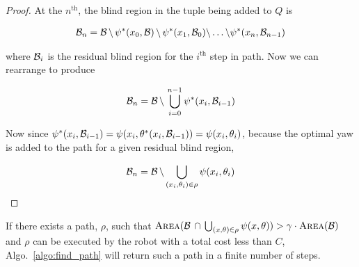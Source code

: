 \begin{proof}

    At the $n^{\text{th}}$, the blind region in the tuple being added to $Q$ is

    \begin{align*}
        {{\mathcal{B}}}_n = {{\mathcal{B}}} \, \backslash \, \psi^*(x_0, {{\mathcal{B}}}) \, \backslash \,
        \psi^*(x_1, {{\mathcal{B}}}_0)
        \backslash \ldots \backslash \psi^*(x_n, {{\mathcal{B}}}_{n - 1})
    \end{align*}

    where ${{\mathcal{B}}}_i$ is the residual blind region for the $i^{\text{th}}$ step in
    path. Now we can rearrange to produce

    \begin{align*}
        {{\mathcal{B}}}_n = {{\mathcal{B}}} \, \backslash \, \bigcup_{i = 0}^{n - 1} 
        \psi^*(x_i, {{\mathcal{B}}}_{i - 1}) \\
    \end{align*}

    Now since $\psi^*(x_i, {{\mathcal{B}}}_{i - 1}) =
    \psi(x_i, \theta^*(x_i, {{\mathcal{B}}}_{i - 1})) = \psi(x_i, \theta_i)$, because
    the optimal yaw is added to the path for a given residual blind region,

    \begin{align*}
        {{\mathcal{B}}}_n = {{\mathcal{B}}} \, \backslash \bigcup_{(x_i, \theta_i) \in \rho}
        \psi(x_i, \theta_i)
    \end{align*}

\end{proof}

\begin{theorem}

    If there exists a path, $\rho$, such that ${\textsc{Area}}(\mathcal{B}
    \, \cap \, \bigcup_{(x, \theta) \in \rho} \psi(x, \theta)) >  \gamma \cdot
    {\textsc{Area}}(\mathcal{B})$ and $\rho$ can be executed by the
    robot with a total cost less than $C$, Algo.~\ref{algo:find_path} will
    return such a path in a finite number of steps.
    
\end{theorem}

